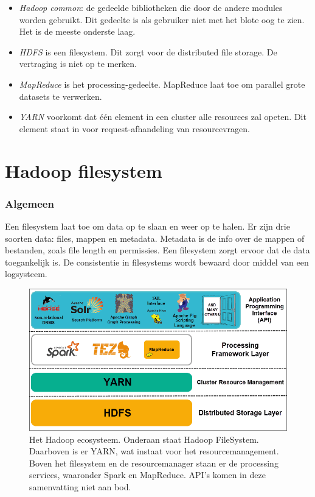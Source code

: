 \documentclass[a4paper,10pt,twoside]{report}
\begin{document}
\begin{itemize}
	\item \textit{Hadoop common}: de gedeelde bibliotheken die door de andere modules worden gebruikt. Dit gedeelte is als gebruiker niet met het blote oog te zien. Het is de meeste onderste laag.
	\item \textit{HDFS} is een filesystem. Dit zorgt voor de distributed file storage. De vertraging is niet op te merken.
	\item \textit{MapReduce} is het processing-gedeelte. MapReduce laat toe om parallel grote datasets te verwerken.
	\item \textit{YARN} voorkomt dat één element in een cluster alle resources zal opeten. Dit element staat in voor request-afhandeling van resourcevragen.
\end{itemize}

\section{Hadoop filesystem}

\subsubsection{Algemeen}

Een filesystem laat toe om data op te slaan en weer op te halen. Er zijn drie soorten data: files, mappen en metadata. Metadata is de info over de mappen of bestanden, zoals file length en permissies. Een filesystem zorgt ervoor dat de data toegankelijk is. De consistentie in filesystems wordt bewaard door middel van een logsysteem. 

\begin{figure}
	\includegraphics[width=\linewidth]{images/hadoop-ecosystem-layers.png}
	\caption{Het Hadoop ecosysteem. Onderaan staat Hadoop FileSystem. Daarboven is er YARN, wat instaat voor het resourcemanagement. Boven het filesystem en de resourcemanager staan er de processing services, waaronder Spark en MapReduce. API's komen in deze samenvatting niet aan bod.}
\end{figure}
\end{document}
